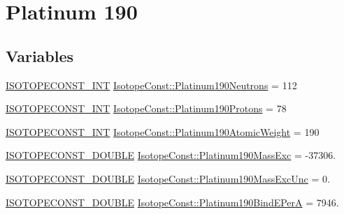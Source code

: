 \hypertarget{group___isotope_const-_platinum-_pt190}{}\section{Platinum 190}
\label{group___isotope_const-_platinum-_pt190}
\subsection*{Variables}
\begin{DoxyCompactItemize}
\item 
\mbox{\hyperlink{group___isotope_const-_macros_ga5f18360b3e99483a35c32d789e62621c}{I\+S\+O\+T\+O\+P\+E\+C\+O\+N\+S\+T\+\_\+\+I\+NT}} \mbox{\hyperlink{group___isotope_const-_platinum-_pt190_ga9ef1a71d4be4125f37ee21bfe39864b0}{Isotope\+Const\+::\+Platinum190\+Neutrons}} = 112
\item 
\mbox{\hyperlink{group___isotope_const-_macros_ga5f18360b3e99483a35c32d789e62621c}{I\+S\+O\+T\+O\+P\+E\+C\+O\+N\+S\+T\+\_\+\+I\+NT}} \mbox{\hyperlink{group___isotope_const-_platinum-_pt190_ga31ed68c6407bf0b32ac76bbbdb10fd17}{Isotope\+Const\+::\+Platinum190\+Protons}} = 78
\item 
\mbox{\hyperlink{group___isotope_const-_macros_ga5f18360b3e99483a35c32d789e62621c}{I\+S\+O\+T\+O\+P\+E\+C\+O\+N\+S\+T\+\_\+\+I\+NT}} \mbox{\hyperlink{group___isotope_const-_platinum-_pt190_ga4b17f404012dc1eea67a50c0353109ee}{Isotope\+Const\+::\+Platinum190\+Atomic\+Weight}} = 190
\item 
\mbox{\hyperlink{group___isotope_const-_macros_ga8f45a7272ce02c0b4c65c44636ed719a}{I\+S\+O\+T\+O\+P\+E\+C\+O\+N\+S\+T\+\_\+\+D\+O\+U\+B\+LE}} \mbox{\hyperlink{group___isotope_const-_platinum-_pt190_gaace6d52fb9a414445dfc5361455b5c83}{Isotope\+Const\+::\+Platinum190\+Mass\+Exc}} = -\/37306.
\item 
\mbox{\hyperlink{group___isotope_const-_macros_ga8f45a7272ce02c0b4c65c44636ed719a}{I\+S\+O\+T\+O\+P\+E\+C\+O\+N\+S\+T\+\_\+\+D\+O\+U\+B\+LE}} \mbox{\hyperlink{group___isotope_const-_platinum-_pt190_ga4f0c0b2c50f83de3019e8db741367f70}{Isotope\+Const\+::\+Platinum190\+Mass\+Exc\+Unc}} = 0.
\item 
\mbox{\hyperlink{group___isotope_const-_macros_ga8f45a7272ce02c0b4c65c44636ed719a}{I\+S\+O\+T\+O\+P\+E\+C\+O\+N\+S\+T\+\_\+\+D\+O\+U\+B\+LE}} \mbox{\hyperlink{group___isotope_const-_platinum-_pt190_gad699bfbc33916fc8d2dde756153bb64e}{Isotope\+Const\+::\+Platinum190\+Bind\+E\+PerA}} = 7946.
\item 

\end{DoxyCompactItemize}
